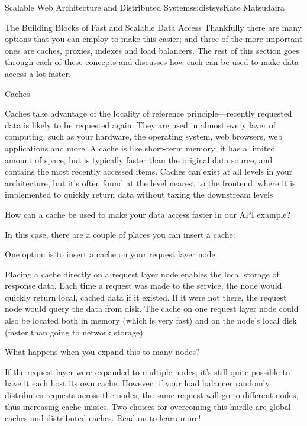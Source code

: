 \begin{aosachapter}{Scalable Web Architecture and Distributed Systems}{s:distsys}{Kate Matsudaira}
\begin{aosasect1}{The Building Blocks of Fast and Scalable Data Access}
Thankfully there are many options that you can employ to make this
easier; and three of the more important ones are caches, proxies,
indexes and load balancers. The rest of this section goes through each
of these concepts and discusses how each can be used to make data
access a lot faster.

\begin{aosasect2}{Caches}

Caches take advantage of the locality of reference
principle---recently requested data is likely to be requested
again. They are used in almost every layer of computing, such as your
hardware, the operating system, web browsers, web applications and
more. A cache is like short-term memory; it has a limited amount of
space, but is typically faster than the original data source, and
contains the most recently accessed items. Caches can exist at all
levels in your architecture, but it's often found at the level nearest
to the frontend, where it is implemented to quickly return data
without taxing the downstream levels

How can a cache be used to make your data access faster in our API
example?

In this case, there are a couple of places you can insert a cache:

One option is to insert a cache on your request layer node:


Placing a cache directly on a request layer node enables the local
storage of response data. Each time a request was made to the service,
the node would quickly return local, cached data if it existed. If it
were not there, the request node would query the data from disk. The
cache on one request layer node could also be located both in memory
(which is very fast) and on the node’s local disk (faster than going
to network storage).

What happens when you expand this to many nodes?


If the request layer were expanded to multiple nodes, it’s still quite
possible to have it each host its own cache. However, if your load
balancer randomly distributes requests across the nodes, the same
request will go to different nodes, thus increasing cache misses. Two
choices for overcoming this hurdle are global caches and distributed
caches. Read on to learn more!


\end{aosasect2}
\end{aosasect1}
\end{aosachapter}
